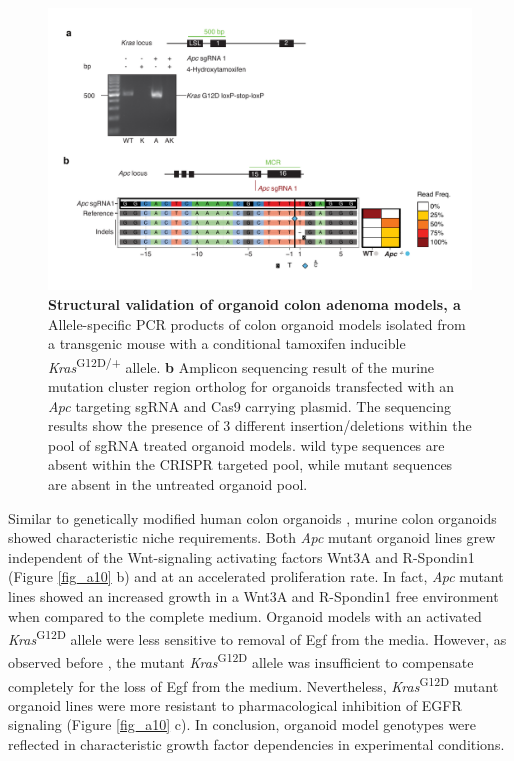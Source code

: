 \begin{flushleft}
\begin{figure}[h]
\centering
\includegraphics[width=\textwidth,
                height=\textheight,
                keepaspectratio]{figures/adenomaprofiling/pdf/fig_1_1.pdf}
\caption[Structural validation of organoid colon adenoma models]{\textbf{Structural validation of organoid colon adenoma models, a} Allele-specific PCR products of colon organoid models isolated from a transgenic mouse with a conditional tamoxifen inducible \textit{Kras}\textsuperscript{G12D/+} allele.
\textbf{b} Amplicon sequencing result of the murine mutation cluster region ortholog for organoids transfected with an \textit{Apc} targeting sgRNA and Cas9 carrying plasmid. The sequencing results show the presence of 3 different insertion/deletions within the pool of sgRNA treated organoid models. wild type sequences are absent within the CRISPR targeted pool, while mutant sequences are absent in the untreated organoid pool.}
\label{fig_a11}
\end{figure}
\bigbreak

Similar to genetically modified human colon organoids \parencite{drostSequentialCancerMutations2015, matanoModelingColorectalCancer2015a}, murine colon organoids showed characteristic niche requirements. Both \textit{Apc} mutant organoid lines grew independent of the Wnt-signaling activating factors Wnt3A and R-Spondin1 (Figure \ref{fig_a10} b) and at an accelerated proliferation rate. In fact, \textit{Apc} mutant lines showed an increased growth in a Wnt3A and R-Spondin1 free environment when compared to the complete medium. Organoid models with an activated \textit{Kras}\textsuperscript{G12D} allele were less sensitive to removal of Egf from the media. However, as observed before \parencite{drostSequentialCancerMutations2015}, the mutant \textit{Kras}\textsuperscript{G12D} allele was insufficient to compensate completely for the loss of Egf from the medium. Nevertheless, \textit{Kras}\textsuperscript{G12D} mutant organoid lines were more resistant to pharmacological inhibition of EGFR signaling (Figure \ref{fig_a10} c). In conclusion, organoid model genotypes were reflected in characteristic growth factor dependencies in experimental conditions.


\end{flushleft}
